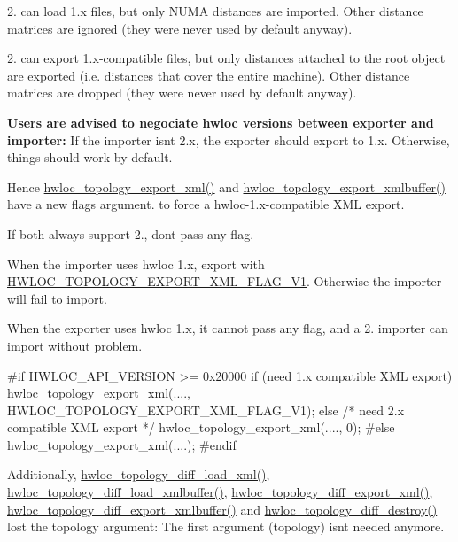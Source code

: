 2. can load 1.\+x files, but only N\+U\+MA distances are imported. Other distance matrices are ignored (they were never used by default anyway).

2. can export 1.\+x-\/compatible files, but only distances attached to the root object are exported (i.\+e. distances that cover the entire machine). Other distance matrices are dropped (they were never used by default anyway).

{\bfseries Users are advised to negociate hwloc versions between exporter and importer\+:} If the importer isn\textquotesingle{}t 2.\+x, the exporter should export to 1.\+x. Otherwise, things should work by default.

Hence \hyperlink{a00206_ga333f79975b4eeb28a3d8fad3373583ce}{hwloc\+\_\+topology\+\_\+export\+\_\+xml()} and \hyperlink{a00206_gad33b7f7c11db10459505a3b1634fd3f1}{hwloc\+\_\+topology\+\_\+export\+\_\+xmlbuffer()} have a new flags argument. to force a hwloc-\/1.\+x-\/compatible X\+ML export. 
\begin{DoxyItemize}
\item If both always support 2., don\textquotesingle{}t pass any flag.  
\item When the importer uses hwloc 1.\+x, export with \hyperlink{a00206_gga0eb99636aff71fe2704e1fa0ffe8c18dae7d6d96546131ef0043867b836b02e0f}{H\+W\+L\+O\+C\+\_\+\+T\+O\+P\+O\+L\+O\+G\+Y\+\_\+\+E\+X\+P\+O\+R\+T\+\_\+\+X\+M\+L\+\_\+\+F\+L\+A\+G\+\_\+\+V1}. Otherwise the importer will fail to import.  
\item When the exporter uses hwloc 1.\+x, it cannot pass any flag, and a 2. importer can import without problem.  
\end{DoxyItemize}

\begin{DoxyVerb}#if HWLOC_API_VERSION >= 0x20000
   if (need 1.x compatible XML export)
      hwloc_topology_export_xml(...., HWLOC_TOPOLOGY_EXPORT_XML_FLAG_V1);
   else /* need 2.x compatible XML export */
      hwloc_topology_export_xml(...., 0);
#else
   hwloc_topology_export_xml(....);
#endif
\end{DoxyVerb}


Additionally, \hyperlink{a00225_ga2cd902ce8766e90d4f2523a8e87640e9}{hwloc\+\_\+topology\+\_\+diff\+\_\+load\+\_\+xml()}, \hyperlink{a00225_gad693810a5c51628529b9dd56f040fb81}{hwloc\+\_\+topology\+\_\+diff\+\_\+load\+\_\+xmlbuffer()}, \hyperlink{a00225_ga8a14dd7d01efbdd97af7fe85e8b84b20}{hwloc\+\_\+topology\+\_\+diff\+\_\+export\+\_\+xml()}, \hyperlink{a00225_gaa2f0918df60c1c4a0bef9411f7d92a13}{hwloc\+\_\+topology\+\_\+diff\+\_\+export\+\_\+xmlbuffer()} and \hyperlink{a00225_ga5dcff18f80583ac6505a94ba2877fd1b}{hwloc\+\_\+topology\+\_\+diff\+\_\+destroy()} lost the topology argument\+: The first argument (topology) isn\textquotesingle{}t needed anymore.

